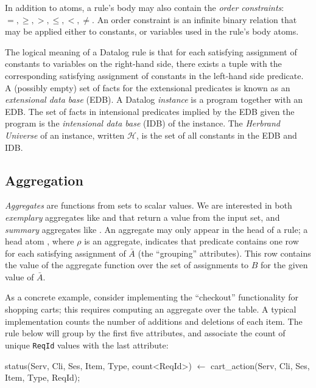 In addition to atoms, a rule's body may also contain the {\em order
constraints}: $=, \geq, >, \leq, <, \neq$.  An order constraint is an infinite
binary relation that may be applied either to constants, or variables used in
the rule's body atoms.

The logical meaning of a Datalog rule is that for each satisfying assignment of
constants to variables on the right-hand side, there exists a tuple with the
corresponding satisfying assignment of constants in the left-hand side
predicate.
A (possibly empty) set of facts for the extensional predicates is known as an
{\em extensional data base} (EDB).  A Datalog {\em instance} is a program
together with an EDB.  The set of facts in intensional predicates implied by
the EDB given the program is the {\em intensional data base} (IDB) of the
instance. The {\em Herbrand Universe} of an instance, written $\mathcal{H}$, is the set of
all constants in the EDB and IDB.

\subsection{Aggregation}

{\em Aggregates} are functions from sets to scalar values.
We are interested in both {\em exemplary} aggregates like  and  that return a value
from the input set, and {\em summary} aggregates like .  An aggregate may only appear in the head
of a rule; a head atom , where $\rho$ is an 
aggregate, indicates that predicate  contains one row for each 
satisfying assignment of $\bar{A}$ (the ``grouping'' attributes).  This row contains the value of the 
aggregate function over the set of assignments to $B$ for the given value of 
$\bar{A}$.

As a concrete example, consider implementing the ``checkout'' functionality for
shopping carts; this requires computing an aggregate over the  table.
A typical implementation counts the number of additions and deletions 
of each item.  The rule below will group by the first five attributes, and associate the
count of unique {\tt ReqId} values with the last attribute: 

\begin{Dedalus}
status(Serv, Cli, Ses, Item, Type, count<ReqId>) \(\leftarrow\)
  cart\_action(Serv, Cli, Ses, Item, Type, ReqId);
\end{Dedalus}

